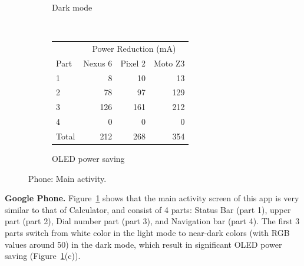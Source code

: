 \begin{figure}[h]
\begin{subfigure}[]{\columnwidth}
		\caption{Dark mode}
	\end{subfigure}
	\\
	\begin{subfigure}[]{\columnwidth}
	\centering
	{ \small
	\begin{tabular}{ | l | r | r | r | }
		\hline
		     & \multicolumn{3}{|c|}{Power Reduction (mA)}\\
		\cline{2-4}
                Part & Nexus 6 & Pixel 2 & Moto Z3 \\
		\hline
		1 &   8  &  10 &   13  \\
		2 &  78  &  97 &  129  \\
		3 & 126  & 161 &  212  \\
		4 &   0  &   0 &    0  \\
		\hline
		Total   & 212 & 268 & 354  \\
		\hline
	\end{tabular}
	}
	\caption{OLED power saving}
        \vspace{-0.1in}
	\end{subfigure}
	\caption{Phone: Main activity.}
	\label{fig:case_study_phone}
\end{figure}

{\bf Google Phone.} Figure~\ref{fig:case_study_phone} shows that the
main activity screen of this app is very similar to that of Calculator,
and consist of 4 parts: Status Bar (part 1), upper part (part 2), Dial
number part (part 3), and Navigation bar (part 4).  The first 3 parts
switch from white color in the light mode to near-dark colors (with
RGB values around 50) in the dark mode, which result in significant
OLED power saving (Figure~\ref{fig:case_study_phone}(c)).

